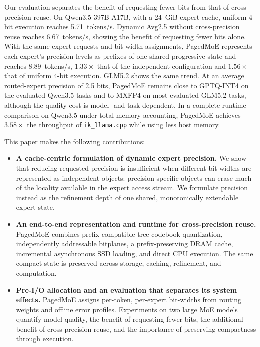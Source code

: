 \documentclass[sigconf, nonacm]{acmart}
\begin{document}
Our evaluation separates the benefit of requesting fewer bits from
that of cross-precision reuse. On Qwen3.5-397B-A17B, with a 24~GiB
expert cache, uniform 4-bit execution reaches 5.71~tokens/s. Dynamic
Avg2.5 without cross-precision reuse reaches 6.67~tokens/s, showing the
benefit of requesting fewer bits alone. With the same expert requests and bit-width assignments, PagedMoE
represents each expert's precision levels as prefixes of one shared
progressive state and reaches 8.89~tokens/s, \(1.33\times\) that of
the independent configuration and \(1.56\times\) that of uniform
4-bit execution. GLM5.2 shows the same trend. At an average
routed-expert precision of 2.5 bits, PagedMoE remains close to
GPTQ-INT4 on the evaluated Qwen3.5 tasks and to MXFP4 on most evaluated
GLM5.2 tasks, although the quality cost is model- and task-dependent.
In a complete-runtime comparison on Qwen3.5 under total-memory
accounting, PagedMoE achieves \(3.58\times\) the throughput of
\texttt{ik\_llama.cpp} while using less host memory.

This paper makes the following contributions:

\begin{itemize}

    \item \textbf{A cache-centric formulation of dynamic expert
    precision.}
    We show that reducing requested precision is insufficient when
    different bit widths are represented as independent objects:
    precision-specific objects can erase much of the locality available in
    the expert access stream. We formulate precision instead as the
    refinement depth of one shared, monotonically extendable expert
    state.

    \item \textbf{An end-to-end representation and runtime for
    cross-precision reuse.}
    PagedMoE combines prefix-compatible tree-codebook quantization,
    independently addressable bitplanes, a prefix-preserving DRAM
    cache, incremental asynchronous SSD loading, and direct CPU
    execution. The same compact state is preserved across storage,
    caching, refinement, and computation.

    \item \textbf{Pre-I/O allocation and an evaluation that separates
    its system effects.}
    PagedMoE assigns per-token, per-expert bit-widths from
    routing weights and offline error profiles. Experiments on two
    large MoE models quantify model quality, the benefit of requesting
    fewer bits, the additional benefit of cross-precision reuse, and
    the importance of preserving compactness through execution.

\end{itemize}
\end{document}
